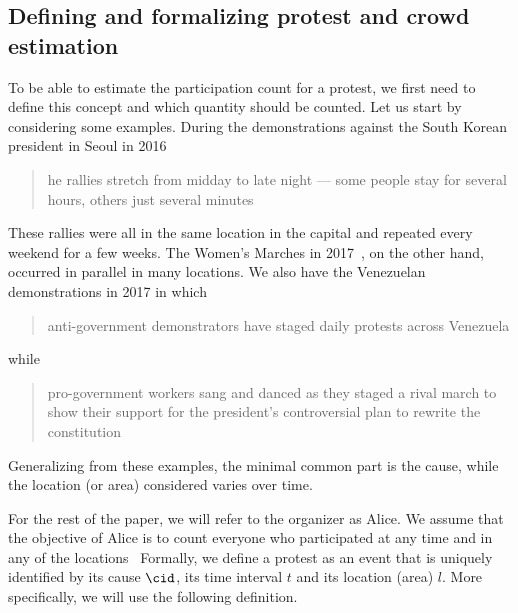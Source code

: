 \subsection{Defining and formalizing protest and crowd estimation}%
\label{protest-model}


To be able to estimate the participation count for a protest, we first need to define this concept and which quantity should be counted.
Let us start by considering some examples.
During the demonstrations against the South Korean president in Seoul in 2016
\blockcquote{2016DemonstrationsInSeoul}{%
  he rallies stretch from midday to late night --- some people stay for several hours, others just several minutes%
}.
These rallies were all in the same location in the capital and repeated every weekend for a few weeks.
The Women's Marches in 2017~\cite{2017WomensMarchesInUS}, on the other hand, occurred in parallel in many locations.
We also have the Venezuelan demonstrations in 2017 in which \blockcquote{2017VenezuelaProtestFrequency}{%
  anti-government demonstrators have staged daily protests across Venezuela%
} while
\blockcquote{AlJazeeraOnVenezuela2017}{%
  pro-government workers sang and danced as they staged a rival march to show their support for the president's controversial plan to rewrite the constitution%
}.
Generalizing from these examples, the minimal common part is the cause,\label{CauseIsTheCommonDenominator} while the location (or area) considered varies over time.

For the rest of the paper, we will refer to the organizer as Alice.
We assume that the objective of Alice is to count everyone who participated at any time and in any of the locations~\cite{2016DemonstrationsInSeoul} %
Formally, we define a protest as an event that is uniquely identified by its cause \(\cid\), its time interval \(t\) and its location (area) \(l\).
More specifically, we will use the following definition.

